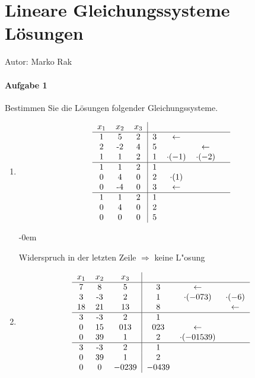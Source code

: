 \chapter{Lineare Gleichungssysteme L\"osungen}
	
	Autor: Marko Rak
	
	\subsubsection{Aufgabe 1}
	
		Bestimmen Sie die L\"osungen folgender Gleichungssysteme.
		
			\begin{enumerate}\abovedisplayskip-0em
				\item 
				
					\[
						\begin{tabular} {ccc|cccc}
							$x_1$ & $x_2$ & $x_3$ & & &\\
							\hline
							1 & 5 & 2 & 3 & $\leftarrow$ & \\
							2 & -2 & 4 & 5 & & $\leftarrow$ \\
							1 & 1 & 2 & 1 & $\cdot(-1)$ & $\cdot(-2)$ \\
							\hline
							1 & 1 & 2 & 1 & & & \\
							0 & 4 & 0 & 2 & $\cdot(1)$ & & \\
							0 & -4 & 0 & 3 & $\leftarrow$ & & \\
							\hline
							1 & 1 & 2 & 1 & & & \\
							0 & 4 & 0 & 2 & & & \\
							0 & 0 & 0 & 5 & & & \\
						\end{tabular}
					\]
					
					\abovedisplayskip-0em
					
					Widerspruch in der letzten Zeile $\Rightarrow$ keine L"osung

					
				\item
				
					\[
						\begin{tabular} {ccc|ccc}
							$x_1$ & $x_2$ & $x_3$ & & &\\
							\hline
							7 & 8 & 5 & 3 & $\leftarrow$ & \\
							3 & -3 & 2 & 1 & $\cdot(-\frac{7}{3})$ & $\cdot(-6)$ \\
							18 & 21 & 13 & 8 & & $\leftarrow$ \\
							\hline
							3 & -3 & 2 & 1 & & \\
							0 & 15 & $\frac{1}{3}$ & $\frac{2}{3}$ & $\leftarrow$ & \\
							0 & 39 & 1 & 2 & $\cdot(-\frac{15}{39})$ & \\
							\hline
							3 & -3 & 2 & 1 & & \\
							0 & 39 & 1 & 2 & & \\
							0 & 0 & $-\frac{2}{39}$ & $-\frac{4}{39}$ & & \\
						\end{tabular}
					\]
					

\end{enumerate}
